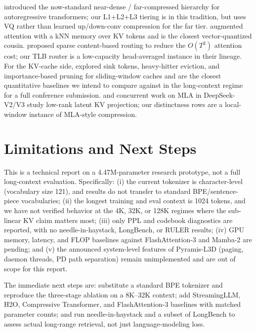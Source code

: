\documentclass[11pt,a4paper]{article}
\begin{document}
\citet{rae2020compressive} introduced the now-standard near-dense / far-compressed
hierarchy for autoregressive transformers; our L1+L2+L3 tiering is in this tradition, but
uses VQ rather than learned up/down-conv compression for the far tier. \citet{wu2022memorizing}
augmented attention with a kNN memory over KV tokens and is the closest vector-quantized
cousin. \citet{child2019generating, kitaev2020reformer, roy2020efficient} proposed sparse
content-based routing to reduce the $O(T^2)$ attention cost; our TLB router is a
low-capacity head-averaged instance in their lineage. For the KV-cache side,
\citet{xiao2023streamingllm, zhang2023h2o, li2024snapkv} explored sink tokens,
heavy-hitter eviction, and importance-based pruning for sliding-window caches and are the
closest quantitative baselines we intend to compare against in the long-context regime for a
full conference submission. \citet{gu2022vq} and concurrent work on MLA in
DeepSeek-V2/V3 \citep{deepseekv2} study low-rank latent KV projection; our distinctness
rows are a local-window instance of MLA-style compression.

\section{Limitations and Next Steps}

This is a technical report on a 4.47M-parameter research prototype, not a full long-context
evaluation. Specifically: (i) the current tokenizer is character-level (vocabulary size
121), and results do not transfer to standard BPE/sentence-piece vocabularies; (ii) the
longest training and eval context is 1024 tokens, and we have not verified behavior at the
4K, 32K, or 128K regimes where the sub-linear KV claim matters most; (iii) only PPL and
codebook diagnostics are reported, with no needle-in-haystack, LongBench, or RULER
\citep{bai2024longbench, hsieh2024ruler} results; (iv) GPU memory, latency, and FLOP baselines against
FlashAttention-3 and Mamba-2 are pending; and (v) the announced system-level features of
Pyramis-L3D (paging, daemon threads, PD path separation) remain unimplemented and are
out of scope for this report.

The immediate next steps are: substitute a standard BPE tokenizer and reproduce the
three-stage ablation on a 8K--32K context; add StreamingLLM, H2O, Compressive Transformer,
and FlashAttention-3 baselines with matched parameter counts; and run
needle-in-haystack and a subset of LongBench to assess actual long-range retrieval, not
just language-modeling loss.

\FloatBarrier


\end{document}
